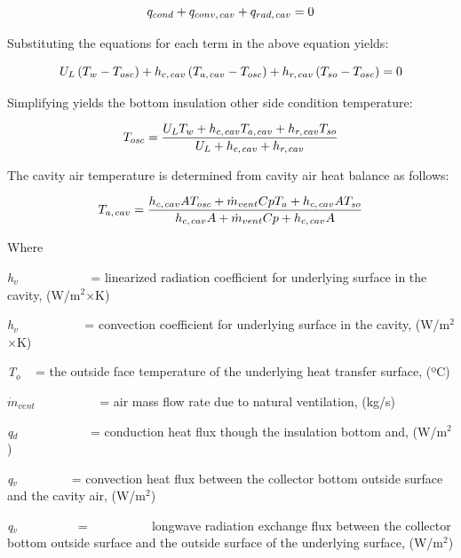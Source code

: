 \begin{equation}
{q_{cond}} + {q_{conv,{\kern 1pt} cav}} + {q_{rad,{\kern 1pt} cav}} = 0
\end{equation}

Substituting the equations for each term in the above equation yields:

\begin{equation}
{U_L}\left( {{T_w} - {T_{osc}}} \right) + {h_{c,{\kern 1pt} cav}}\left( {{T_{a,{\kern 1pt} cav}} - {T_{osc}}} \right) + {h_{r,{\kern 1pt} cav}}\left( {{T_{so}} - {T_{osc}}} \right) = 0
\end{equation}

Simplifying yields the bottom insulation other side condition temperature:

\begin{equation}
{T_{osc}} = \frac{{{U_L}{T_w} + {h_{c,{\kern 1pt} cav}}{T_{a,{\kern 1pt} cav}} + {h_{r,{\kern 1pt} cav}}{T_{so}}}}{{{U_L} + {h_{c,{\kern 1pt} cav}} + {h_{r,{\kern 1pt} cav}}}}
\end{equation}

The cavity air temperature is determined from cavity air heat balance as follows:

\begin{equation}
{T_{a,{\kern 1pt} cav}} = \frac{{{h_{c,{\kern 1pt} cav}}A{T_{osc}} + {{\dot m}_{vent}}Cp{T_a} + {h_{c,{\kern 1pt} cav}}A{T_{so}}}}{{{h_{c,{\kern 1pt} cav}}A + {{\dot m}_{vent}}Cp + {h_{c,{\kern 1pt} cav}}A}}
\end{equation}

Where

\emph{h\(_{v}\)}~~~~~~~~~~~ = linearized radiation coefficient for underlying surface in the cavity, (W/m\(^{2}\)×K)

\emph{h\(_{v}\)}~~~~~~~~~~ = convection coefficient for underlying surface in the cavity, (W/m\(^{2}\)×K)

\emph{T\(_{o}\)} ~ = the outside face temperature of the underlying heat transfer surface, (ºC)

\({\dot m_{vent}}\) ~~~~~~~~~ = air mass flow rate due to natural ventilation, (kg/s)

\emph{q\(_{d}\)}~~~~~~~~~~~ = conduction heat flux though the insulation bottom and, (W/m\(^{2}\))

\emph{q\(_{v}\)}~~~~~~~~ = convection heat flux between the collector bottom outside surface and the cavity air, (W/m\(^{2}\))

\emph{q\(_{v}\)}~~~~~~~~~ = ~~~~~~~~~ longwave radiation exchange flux between the collector bottom outside surface and the outside surface of the underlying surface, (W/m\(^{2}\))

